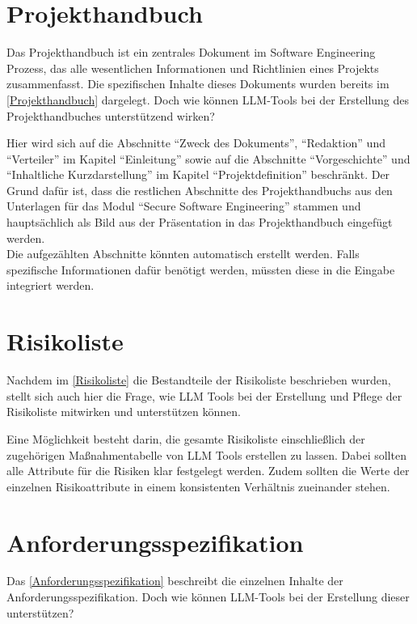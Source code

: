 \section{Projekthandbuch}  \label{LLMProjekthandbuch}

Das Projekthandbuch ist ein zentrales Dokument im Software Engineering Prozess, das alle wesentlichen Informationen und 
Richtlinien eines Projekts zusammenfasst. Die spezifischen Inhalte dieses Dokuments wurden bereits im 
\autoref{Projekthandbuch} dargelegt. Doch wie können LLM-Tools bei der Erstellung des 
Projekthandbuches unterstützend wirken?

Hier wird sich auf die Abschnitte ``Zweck des Dokuments'', ``Redaktion'' und ``Verteiler'' im Kapitel ``Einleitung'' 
sowie auf die Abschnitte ``Vorgeschichte'' und ``Inhaltliche Kurzdarstellung'' im Kapitel ``Projektdefinition'' 
beschränkt. Der Grund dafür ist, dass die restlichen Abschnitte des Projekthandbuchs aus den Unterlagen für 
das Modul ``Secure Software Engineering'' stammen und hauptsächlich als Bild aus der Präsentation in das Projekthandbuch 
eingefügt werden.\\
Die aufgezählten Abschnitte könnten automatisch erstellt werden. Falls spezifische Informationen dafür benötigt 
werden, müssten diese in die Eingabe integriert werden.

\section{Risikoliste}  \label{LLMRisikoliste}

Nachdem im \autoref{Risikoliste} die Bestandteile der Risikoliste beschrieben wurden, stellt sich auch hier die Frage, 
wie LLM Tools bei der Erstellung und Pflege der Risikoliste mitwirken und unterstützen können.

Eine Möglichkeit besteht darin, die gesamte Risikoliste einschließlich der zugehörigen Maßnahmentabelle von LLM Tools 
erstellen zu lassen. Dabei sollten alle Attribute für die Risiken klar festgelegt werden. Zudem sollten die Werte 
der einzelnen Risikoattribute in einem konsistenten Verhältnis zueinander stehen.


\section{Anforderungsspezifikation}  \label{LLMAnforderungsspezifikation}

Das \autoref{Anforderungsspezifikation} beschreibt die einzelnen Inhalte der Anforderungsspezifikation. Doch wie 
können LLM-Tools bei der Erstellung dieser unterstützen?

